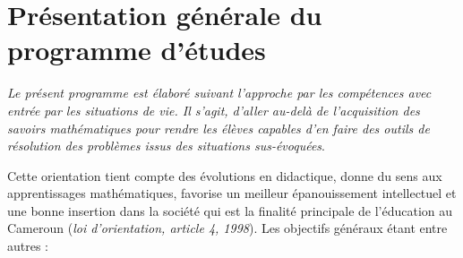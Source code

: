\chapter*{Présentation générale du programme d'études}

\minitoc

{\AlegreyaSansLight \textit{Le présent programme est élaboré suivant l'approche par les compétences avec entrée par les situations de vie. Il s'agit, d'aller au-delà de l'acquisition des savoirs mathématiques pour rendre les élèves capables d'en faire des outils de résolution des problèmes issus des situations sus-évoquées}.}

\vspace{.5cm}

Cette orientation tient compte des évolutions en didactique, donne du sens aux apprentissages mathématiques, favorise un meilleur épanouissement intellectuel et une bonne insertion dans la société qui est la finalité principale de l'éducation au Cameroun (\textit{loi d'orientation, article 4, 1998}). Les objectifs généraux étant entre autres :

